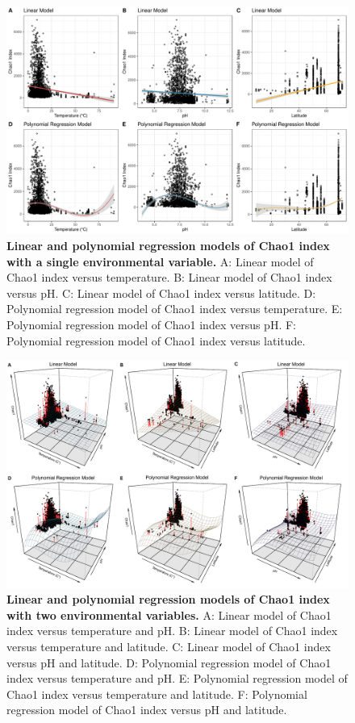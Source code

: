 \documentclass[11pt, a4paper]{article}
\begin{document}
\begin{spacing}{1.5}
\begin{figure}
    \centering
    \includegraphics[scale=0.33]{./Figures/Chao_LM_PM_simpleTpL}
    \caption{\textbf{Linear and polynomial regression models of Chao1 index with a single environmental variable.} A: Linear model of Chao1 index versus temperature. B: Linear model of Chao1 index versus pH. C: Linear model of Chao1 index versus latitude. D: Polynomial regression model of Chao1 index versus temperature. E: Polynomial regression model of Chao1 index versus pH. F: Polynomial regression model of Chao1 index versus latitude.}
    \label{fig:Chao_simpleTpL}
\end{figure}

\begin{figure}
    \centering
    \includegraphics[scale=0.33]{./Figures/Chao_LM_PM_all_2EVs_3D}
    \caption{\textbf{Linear and polynomial regression models of Chao1 index with two environmental variables.} A: Linear model of Chao1 index versus temperature and pH. B: Linear model of Chao1 index versus temperature and latitude. C: Linear model of Chao1 index versus pH and latitude. D: Polynomial regression model of Chao1 index versus temperature and pH. E: Polynomial regression model of Chao1 index versus temperature and latitude. F: Polynomial regression model of Chao1 index versus pH and latitude.}
    \label{fig:Chao_2EVs}
\end{figure}


\end{spacing}
\end{document}
